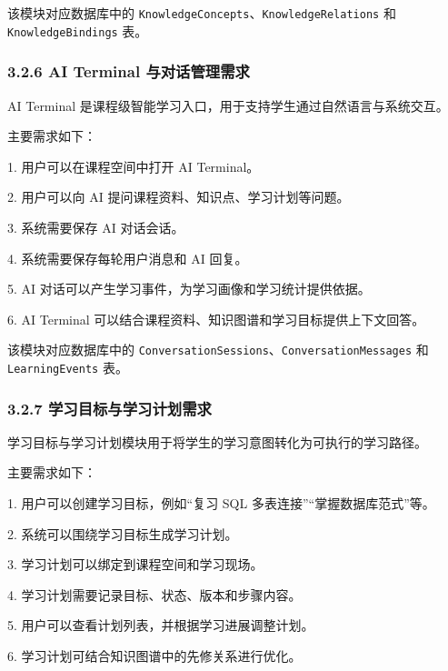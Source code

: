 \documentclass[10pt,a4paper,fontset=none]{ctexart}
\begin{document}
该模块对应数据库中的 \texttt{KnowledgeConcepts}、\texttt{KnowledgeRelations} 和 \texttt{KnowledgeBindings} 表。\par

\subsubsection*{3.2.6 AI Terminal 与对话管理需求}

AI Terminal 是课程级智能学习入口，用于支持学生通过自然语言与系统交互。\par

主要需求如下：\par

1. 用户可以在课程空间中打开 AI Terminal。\par
2. 用户可以向 AI 提问课程资料、知识点、学习计划等问题。\par
3. 系统需要保存 AI 对话会话。\par
4. 系统需要保存每轮用户消息和 AI 回复。\par
5. AI 对话可以产生学习事件，为学习画像和学习统计提供依据。\par
6. AI Terminal 可以结合课程资料、知识图谱和学习目标提供上下文回答。\par

该模块对应数据库中的 \texttt{ConversationSessions}、\texttt{ConversationMessages} 和 \texttt{LearningEvents} 表。\par

\subsubsection*{3.2.7 学习目标与学习计划需求}

学习目标与学习计划模块用于将学生的学习意图转化为可执行的学习路径。\par

主要需求如下：\par

1. 用户可以创建学习目标，例如“复习 SQL 多表连接”“掌握数据库范式”等。\par
2. 系统可以围绕学习目标生成学习计划。\par
3. 学习计划可以绑定到课程空间和学习现场。\par
4. 学习计划需要记录目标、状态、版本和步骤内容。\par
5. 用户可以查看计划列表，并根据学习进展调整计划。\par
6. 学习计划可结合知识图谱中的先修关系进行优化。\par
\end{document}
